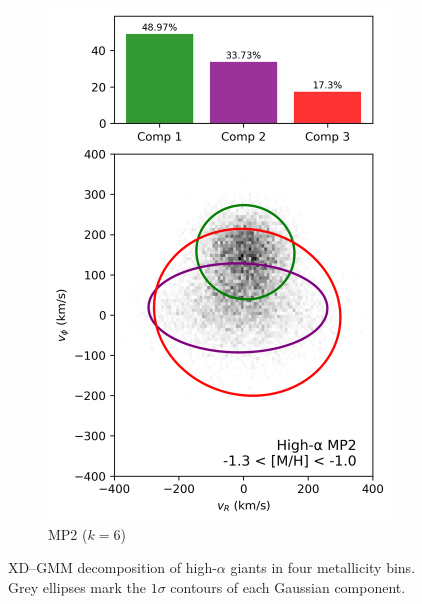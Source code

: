\documentclass[a4paper,12pt]{article}
\begin{document}
\begin{figure}[H]
\begin{subfigure}{0.245\linewidth}
    \includegraphics[width=\linewidth]{../figures/gmm_mp2_high_alpha_k6.png}
    \caption{MP2 ($k{=}6$)}
    \label{fig:mp2_hi}
  \end{subfigure}

  \caption{XD--GMM decomposition of high-$\alpha$ giants in four metallicity bins. Grey ellipses mark the $1\sigma$ contours of each Gaussian component.}
  \label{fig:gmm_4wide_hi}
\end{figure}
\end{document}
